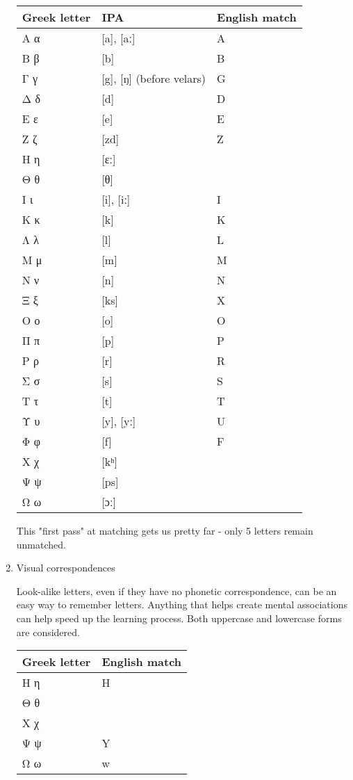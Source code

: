 \documentclass[11pt]{article}
\begin{document}
\begin{enumerate}
\begin{center}
\begin{tabular}{lll}
Greek letter & IPA & English match\\
\hline
Α α & [a], [aː] & A\\
Β β & [b] & B\\
Γ γ & [g], [ŋ] (before velars) & G\\
Δ δ & [d] & D\\
Ε ε & [e] & E\\
Ζ ζ & [zd] & Z\\
Η η & [ɛː] & \\
Θ θ & [θ] & \\
Ι ι & [i], [iː] & I\\
Κ κ & [k] & K\\
Λ λ & [l] & L\\
Μ μ & [m] & M\\
Ν ν & [n] & N\\
Ξ ξ & [ks] & X\\
Ο ο & [o] & O\\
Π π & [p] & P\\
Ρ ρ & [r] & R\\
Σ σ & [s] & S\\
Τ τ & [t] & T\\
Υ υ & [y], [yː] & U\\
Φ φ & [f] & F\\
Χ χ & [kʰ] & \\
Ψ ψ & [ps] & \\
Ω ω & [ɔː] & \\
\end{tabular}
\end{center}

This "first pass" at matching gets us pretty far - only 5 letters remain unmatched.

\item Visual correspondences
\label{sec:org48611df}

Look-alike letters, even if they have no phonetic correspondence, can be an easy way to remember letters. Anything that helps create mental associations can help speed up the learning process. Both uppercase and lowercase forms are considered.

\begin{center}
\begin{tabular}{ll}
Greek letter & English match\\
\hline
Η η & H\\
Θ θ & \\
Χ χ & \\
Ψ ψ & Y\\
Ω ω & w\\
\end{tabular}
\end{center}


\end{enumerate}
\end{document}
